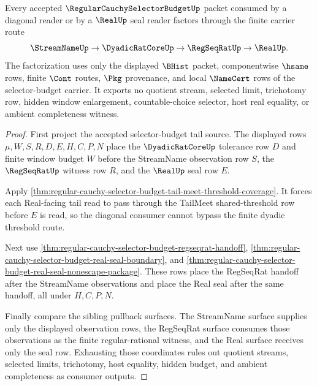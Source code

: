\begin{theorem}
\label{thm:regular-cauchy-selector-budget-diagonal-consumer-nonescape}
Every accepted $\RegularCauchySelectorBudgetUp$ packet consumed by a diagonal reader or by a $\RealUp$ seal reader factors through the finite carrier route
$$
\StreamNameUp \to \DyadicRatCoreUp \to \RegSeqRatUp \to \RealUp.
$$
The factorization uses only the displayed $\BHist$ packet, componentwise $\hsame$ rows, finite $\Cont$ routes, $\Pkg$ provenance, and local $\NameCert$ rows of the selector-budget carrier. It exports no quotient stream, selected limit, trichotomy row, hidden window enlargement, countable-choice selector, host real equality, or ambient completeness witness.
\end{theorem}
\begin{proof}
First project the accepted selector-budget tail source. The displayed rows $\mu,W,S,R,D,E,H,C,P,N$ place the $\DyadicRatCoreUp$ tolerance row $D$ and finite window budget $W$ before the StreamName observation row $S$, the $\RegSeqRatUp$ witness row $R$, and the $\RealUp$ seal row $E$.

Apply \autoref{thm:regular-cauchy-selector-budget-tail-meet-threshold-coverage}. It forces each Real-facing tail read to pass through the TailMeet shared-threshold row before $E$ is read, so the diagonal consumer cannot bypass the finite dyadic threshold route.

Next use \autoref{thm:regular-cauchy-selector-budget-regseqrat-handoff}, \autoref{thm:regular-cauchy-selector-budget-real-seal-boundary}, and \autoref{thm:regular-cauchy-selector-budget-real-seal-nonescape-package}. These rows place the RegSeqRat handoff after the StreamName observations and place the Real seal after the same handoff, all under $H,C,P,N$.

Finally compare the sibling pullback surfaces. The StreamName surface supplies only the displayed observation rows, the RegSeqRat surface consumes those observations as the finite regular-rational witness, and the Real surface receives only the seal row. Exhausting those coordinates rules out quotient streams, selected limits, trichotomy, host equality, hidden budget, and ambient completeness as consumer outputs.
\end{proof}


